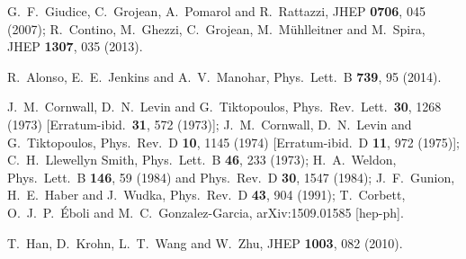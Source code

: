  G.~F.~Giudice, C.~Grojean, A.~Pomarol and R.~Rattazzi,
  JHEP {\bf 0706}, 045 (2007);
  R.~Contino, M.~Ghezzi, C.~Grojean, M.~M\"uhlleitner and M.~Spira,
  JHEP {\bf 1307}, 035 (2013).
  
  R.~Alonso, E.~E.~Jenkins and A.~V.~Manohar,
  Phys.\ Lett.\ B {\bf 739}, 95 (2014).
  
  J.~M.~Cornwall, D.~N.~Levin and G.~Tiktopoulos,
  Phys.\ Rev.\ Lett.\  {\bf 30}, 1268 (1973)
  [Erratum-ibid.\  {\bf 31}, 572 (1973)];
  J.~M.~Cornwall, D.~N.~Levin and G.~Tiktopoulos,
  Phys.\ Rev.\ D {\bf 10}, 1145 (1974)
  [Erratum-ibid.\ D {\bf 11}, 972 (1975)];
  C.~H.~Llewellyn Smith,
  Phys.\ Lett.\ B {\bf 46}, 233 (1973);
  H.~A.~Weldon,
  Phys.\ Lett.\ B {\bf 146}, 59 (1984)
  and
  Phys.\ Rev.\ D {\bf 30}, 1547 (1984);
  J.~F.~Gunion, H.~E.~Haber and J.~Wudka,
  Phys.\ Rev.\ D {\bf 43}, 904 (1991);
  T.~Corbett, O.~J.~P.~\'Eboli and M.~C.~Gonzalez-Garcia,
  arXiv:1509.01585 [hep-ph].

  T.~Han, D.~Krohn, L.~T.~Wang and W.~Zhu,
  JHEP {\bf 1003}, 082 (2010).

